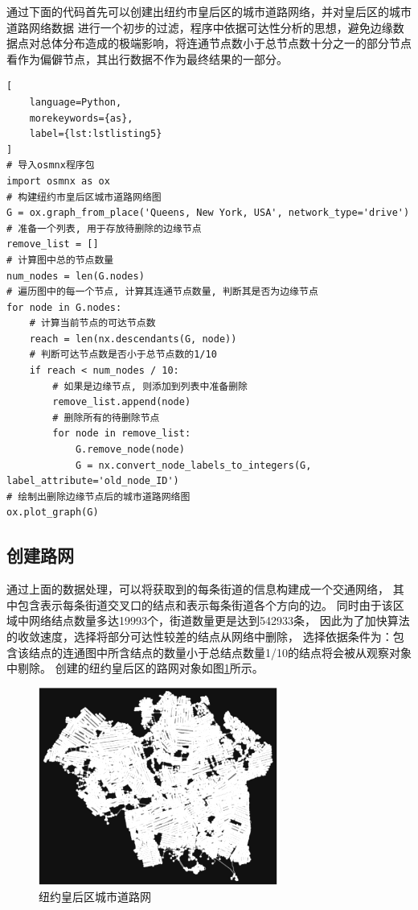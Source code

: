 通过下面的代码首先可以创建出纽约市皇后区的城市道路网络，并对皇后区的城市道路网络数据
进行一个初步的过滤，程序中依据可达性分析的思想，避免边缘数据点对总体分布造成的极端影响，将连通节点数小于总节点数十分之一的部分节点看作为偏僻节点，其出行数据不作为最终结果的一部分。

\begin{lstlisting}[
    language=Python,
    morekeywords={as},
    label={lst:lstlisting5}
]
# 导入osmnx程序包
import osmnx as ox
# 构建纽约市皇后区城市道路网络图
G = ox.graph_from_place('Queens, New York, USA', network_type='drive')
# 准备一个列表, 用于存放待删除的边缘节点
remove_list = []
# 计算图中总的节点数量
num_nodes = len(G.nodes)
# 遍历图中的每一个节点, 计算其连通节点数量, 判断其是否为边缘节点
for node in G.nodes:
    # 计算当前节点的可达节点数
    reach = len(nx.descendants(G, node))
    # 判断可达节点数是否小于总节点数的1/10
    if reach < num_nodes / 10:
        # 如果是边缘节点, 则添加到列表中准备删除
        remove_list.append(node)
        # 删除所有的待删除节点
        for node in remove_list:
            G.remove_node(node)
            G = nx.convert_node_labels_to_integers(G, label_attribute='old_node_ID')
# 绘制出删除边缘节点后的城市道路网络图
ox.plot_graph(G)
\end{lstlisting}

\subsection{创建路网}\label{subsec:创建路网}
通过上面的数据处理，可以将获取到的每条街道的信息构建成一个交通网络，
其中包含表示每条街道交叉口的结点和表示每条街道各个方向的边。
同时由于该区域中网络结点数量多达19993个，街道数量更是达到542933条，
因此为了加快算法的收敛速度，选择将部分可达性较差的结点从网络中删除，
选择依据条件为：包含该结点的连通图中所含结点的数量小于总结点数量1/10的结点将会被从观察对象中剔除。
创建的纽约皇后区的路网对象如图\ref{fig:fig26}所示。

\begin{figure}[H] %
    \centering %
    \includegraphics[width=0.7\textwidth]{png/图片26 纽约皇后区城市道路网} %
    \caption{纽约皇后区城市道路网} %
    \label{fig:fig26} %
\end{figure}

